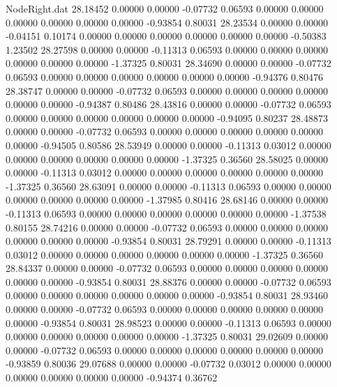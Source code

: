 \begin{filecontents}{NodeRight.dat}
  28.18452    0.00000    0.00000    -0.07732    0.06593    0.00000    0.00000    0.00000    0.00000    0.00000    0.00000   -0.93854    0.80031
  28.23534    0.00000    0.00000    -0.04151    0.10174    0.00000    0.00000    0.00000    0.00000    0.00000    0.00000   -0.50383    1.23502
  28.27598    0.00000    0.00000    -0.11313    0.06593    0.00000    0.00000    0.00000    0.00000    0.00000    0.00000   -1.37325    0.80031
  28.34690    0.00000    0.00000    -0.07732    0.06593    0.00000    0.00000    0.00000    0.00000    0.00000    0.00000   -0.94376    0.80476
  28.38747    0.00000    0.00000    -0.07732    0.06593    0.00000    0.00000    0.00000    0.00000    0.00000    0.00000   -0.94387    0.80486
  28.43816    0.00000    0.00000    -0.07732    0.06593    0.00000    0.00000    0.00000    0.00000    0.00000    0.00000   -0.94095    0.80237
  28.48873    0.00000    0.00000    -0.07732    0.06593    0.00000    0.00000    0.00000    0.00000    0.00000    0.00000   -0.94505    0.80586
  28.53949    0.00000    0.00000    -0.11313    0.03012    0.00000    0.00000    0.00000    0.00000    0.00000    0.00000   -1.37325    0.36560
  28.58025    0.00000    0.00000    -0.11313    0.03012    0.00000    0.00000    0.00000    0.00000    0.00000    0.00000   -1.37325    0.36560
  28.63091    0.00000    0.00000    -0.11313    0.06593    0.00000    0.00000    0.00000    0.00000    0.00000    0.00000   -1.37985    0.80416
  28.68146    0.00000    0.00000    -0.11313    0.06593    0.00000    0.00000    0.00000    0.00000    0.00000    0.00000   -1.37538    0.80155
  28.74216    0.00000    0.00000    -0.07732    0.06593    0.00000    0.00000    0.00000    0.00000    0.00000    0.00000   -0.93854    0.80031
  28.79291    0.00000    0.00000    -0.11313    0.03012    0.00000    0.00000    0.00000    0.00000    0.00000    0.00000   -1.37325    0.36560
  28.84337    0.00000    0.00000    -0.07732    0.06593    0.00000    0.00000    0.00000    0.00000    0.00000    0.00000   -0.93854    0.80031
  28.88376    0.00000    0.00000    -0.07732    0.06593    0.00000    0.00000    0.00000    0.00000    0.00000    0.00000   -0.93854    0.80031
  28.93460    0.00000    0.00000    -0.07732    0.06593    0.00000    0.00000    0.00000    0.00000    0.00000    0.00000   -0.93854    0.80031
  28.98523    0.00000    0.00000    -0.11313    0.06593    0.00000    0.00000    0.00000    0.00000    0.00000    0.00000   -1.37325    0.80031
  29.02609    0.00000    0.00000    -0.07732    0.06593    0.00000    0.00000    0.00000    0.00000    0.00000    0.00000   -0.93859    0.80036
  29.07688    0.00000    0.00000    -0.07732    0.03012    0.00000    0.00000    0.00000    0.00000    0.00000    0.00000   -0.94374    0.36762

\end{filecontents}
